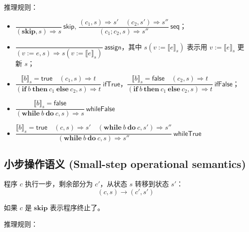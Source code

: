 \documentclass[UTF8]{ctexart}
\begin{document}
    推理规则：

    \begin{itemize}
        \setlength{\itemsep}{1em}
        \setlength{\parsep}{1em}
        \item $\dfrac{}{(\mathbf{skip}, s) \Rightarrow s}\ \mathsf{skip}$, $\dfrac{(c_1, s) \Rightarrow s'\quad (c_2,s') \Rightarrow s''}{(c_1;c_2,s) \Rightarrow s''}\ \mathsf{seq}$；
        \item $\dfrac{}{(v:=e, s) \Rightarrow s(v:= {\llbracket e \rrbracket}_s)}\ \mathsf{assign}$，其中 $s(v:= {\llbracket e \rrbracket}_s)$ 表示用 $v := {\llbracket e \rrbracket}_s$ 更新 $s$；
        \item $\dfrac{{\llbracket b \rrbracket}_s = \mathsf{true}\quad (c_1,s)\Rightarrow t}{(\mathbf{if}\ b\ \mathbf{then}\ c_1\ \mathbf{else}\ c_2, s) \Rightarrow t}\ \mathsf{ifTrue}$，$\dfrac{{\llbracket b \rrbracket}_s = \mathsf{false}\quad (c_2,s)\Rightarrow t}{(\mathbf{if}\ b\ \mathbf{then}\ c_1\ \mathbf{else}\ c_2, s) \Rightarrow t}\ \mathsf{ifFalse}$；
        \item $\dfrac{{\llbracket b \rrbracket}_s=\mathsf{false}}{(\mathbf{while}\ b\ \mathbf{do}\ c, s)\Rightarrow s}\ \mathsf{whileFalse}$
        \item $\dfrac{{\llbracket b \rrbracket}_s=\mathsf{true}\quad (c,s)\Rightarrow s'\quad (\mathbf{while}\ b\ \mathbf{do}\ c, s')\Rightarrow s''}{(\mathbf{while}\ b\ \mathbf{do}\ c, s)\Rightarrow s''}\ \mathsf{whileTrue}$
    \end{itemize}

    \subsection*{小步操作语义 (Small-step operational semantics)}

    程序 $c$ 执行一步，剩余部分为 $c'$，从状态 $s$ 转移到状态 $s'$：$$(c, s) \to (c', s')$$

    如果 $c$ 是 $\mathbf{skip}$ 表示程序终止了。

    推理规则：
\end{document}
